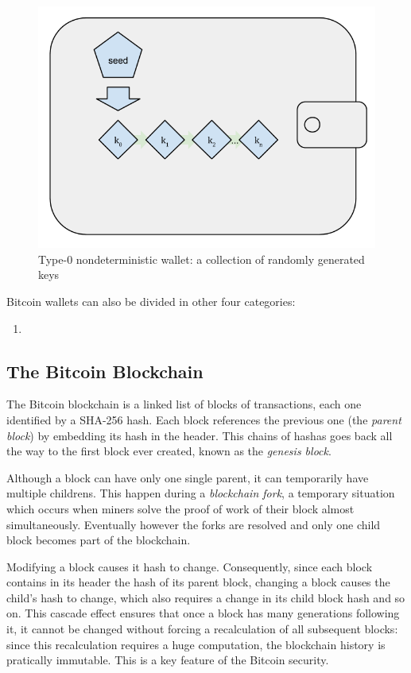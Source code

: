 \begin{figure}[!htb]
	\centering
	\includegraphics[width=0.5\linewidth]{img/deterministic-wallet.png}
	\caption{Type-0 nondeterministic wallet: a collection of randomly generated keys}
	\label{fig:deterministic-wallet}
\end{figure}


Bitcoin wallets can also be divided in other four categories:
\begin{enumerate}
  \item 
\end{enumerate}





\subsection{The Bitcoin Blockchain} The Bitcoin blockchain is a linked list of
blocks of transactions, each one  identified by a SHA-256 hash. Each block
references the previous one (the \emph{parent block}) by embedding its hash in
the header. This chains of hashas goes back all the way to the first block ever
created, known as the \emph{genesis block}.

Although a block can have only one single parent, it can temporarily have
multiple childrens. This happen during a \emph{blockchain fork}, a temporary
situation which occurs when miners solve the proof of work of their block almost
simultaneously. Eventually however the forks are resolved and  only one child
block becomes part of the blockchain.

Modifying a block causes it hash to change. Consequently, since each block
contains in its header the hash of its parent block, changing a block causes
the child’s hash to change, which also requires a change in its child block hash
and so on. This cascade effect ensures that once a block has many generations
following it, it cannot be changed without forcing a recalculation of all
subsequent blocks: since this recalculation requires a huge computation, the
blockchain history is pratically immutable. This is a key feature of the Bitcoin
security.


